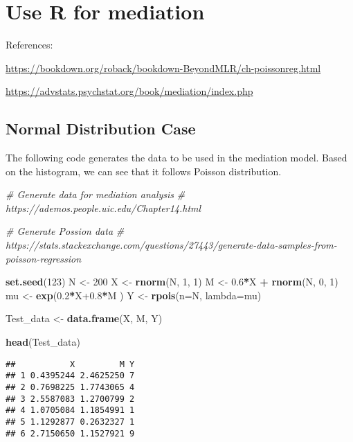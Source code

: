 \documentclass[]{book}
\newenvironment{Shaded}{\begin{snugshade}}{\end{snugshade}}
\newcommand{\CommentTok}[1]{\textcolor[rgb]{0.56,0.35,0.01}{\textit{#1}}}
\newcommand{\DataTypeTok}[1]{\textcolor[rgb]{0.13,0.29,0.53}{#1}}
\newcommand{\DecValTok}[1]{\textcolor[rgb]{0.00,0.00,0.81}{#1}}
\newcommand{\FloatTok}[1]{\textcolor[rgb]{0.00,0.00,0.81}{#1}}
\newcommand{\KeywordTok}[1]{\textcolor[rgb]{0.13,0.29,0.53}{\textbf{#1}}}
\newcommand{\NormalTok}[1]{#1}
\newcommand{\OperatorTok}[1]{\textcolor[rgb]{0.81,0.36,0.00}{\textbf{#1}}}
\newcommand{\StringTok}[1]{\textcolor[rgb]{0.31,0.60,0.02}{#1}}
\begin{document}
\hypertarget{use-r-for-mediation}{%
\chapter{Use R for mediation}\label{use-r-for-mediation}}

References:

\url{https://bookdown.org/roback/bookdown-BeyondMLR/ch-poissonreg.html}

\url{https://advstats.psychstat.org/book/mediation/index.php}

\hypertarget{normal-distribution-case}{%
\section{Normal Distribution Case}\label{normal-distribution-case}}

The following code generates the data to be used in the mediation model. Based on the histogram, we can see that it follows Poisson distribution.

\begin{Shaded}
\begin{Highlighting}[]
\CommentTok{# Generate data for mediation analysis}
\CommentTok{# https://ademos.people.uic.edu/Chapter14.html}

\CommentTok{# Generate Possion data}
\CommentTok{# https://stats.stackexchange.com/questions/27443/generate-data-samples-from-poisson-regression}

\KeywordTok{set.seed}\NormalTok{(}\DecValTok{123}\NormalTok{) }
\NormalTok{N <-}\StringTok{ }\DecValTok{200} 
\NormalTok{X <-}\StringTok{ }\KeywordTok{rnorm}\NormalTok{(N, }\DecValTok{1}\NormalTok{, }\DecValTok{1}\NormalTok{)   }
\NormalTok{M <-}\StringTok{ }\FloatTok{0.6}\OperatorTok{*}\NormalTok{X }\OperatorTok{+}\StringTok{ }\KeywordTok{rnorm}\NormalTok{(N, }\DecValTok{0}\NormalTok{, }\DecValTok{1}\NormalTok{) }
\NormalTok{mu <-}\StringTok{ }\KeywordTok{exp}\NormalTok{(}\FloatTok{0.2}\OperatorTok{*}\NormalTok{X}\FloatTok{+0.8}\OperatorTok{*}\NormalTok{M ) }
\NormalTok{Y <-}\StringTok{ }\KeywordTok{rpois}\NormalTok{(}\DataTypeTok{n=}\NormalTok{N, }\DataTypeTok{lambda=}\NormalTok{mu)}

\NormalTok{Test_data <-}\StringTok{ }\KeywordTok{data.frame}\NormalTok{(X, M, Y)}

\KeywordTok{head}\NormalTok{(Test_data)}
\end{Highlighting}
\end{Shaded}

\begin{verbatim}
##           X         M Y
## 1 0.4395244 2.4625250 7
## 2 0.7698225 1.7743065 4
## 3 2.5587083 1.2700799 2
## 4 1.0705084 1.1854991 1
## 5 1.1292877 0.2632327 1
## 6 2.7150650 1.1527921 9
\end{verbatim}
\end{document}
